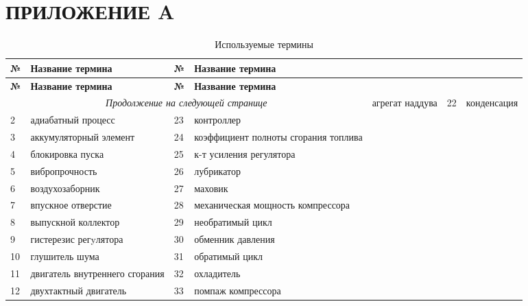 \section*{ПРИЛОЖЕНИЕ A}\label{sec:app-A}
\begin{longtable}{|p{0.5cm}|p{7cm}|p{0.5cm}|p{7cm}|}
	\caption{Используемые термины}\label{table_terms}\\
	\hline
	
	\textbf{№} & \textbf{Название термина} & \textbf{№} & \textbf{Название термина}\\ 
	\hline
	\endfirsthead
	
	\hline
	\textbf{№} & \textbf{Название термина} & \textbf{№} & \textbf{Название термина}\\ 
	\hline
	\endhead
	
	\hline
	\multicolumn{4}{c}{\textit{Продолжение на следующей странице}}
	\endfoot
	\hline
	\endlastfoot
	
	1 & агрегат наддува & 22 & конденсация\\
	\hline
	
	2 & адиабатный процесс & 23 & контроллер\\
	\hline
	
	3 & аккумуляторный элемент & 24 & коэффициент полноты сгорания топлива \\
	\hline
	
	4 & блокировка пуска & 25 & к-т усиления регулятора \\
	\hline
	
	5 & вибропрочность & 26 & лубрикатор \\
	\hline
	
	6 & воздухозаборник & 27 & маховик \\
	\hline
	
	7 & впускное отверстие & 28 & механическая мощность компрессора \\
	\hline
	
	8 & выпускной коллектор & 29 & необратимый цикл \\
	\hline
	
	9 & гистерезис регyлятора & 30 & обменник давления \\
	\hline
	
	10 & глушитель шума & 31 & обратимый цикл \\ 
	\hline
	
	11 & двигатель внутреннего сгорания & 32 & охладитель \\ 
	\hline
	
	12 & двухтактный двигатель & 33 & помпаж компрессора \\
	\hline
	

\end{longtable}
